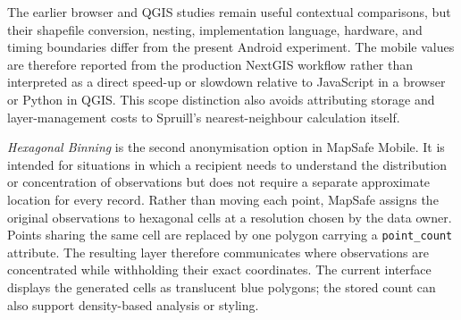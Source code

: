 \documentclass[a4paper,UKenglish,cleveref,autoref,thm-restate]{lipics-v2021}
\begin{document}
The earlier browser and QGIS studies remain useful contextual comparisons, but their shapefile conversion, nesting, implementation language, hardware, and timing boundaries differ from the present Android experiment. The mobile values are therefore reported from the production NextGIS workflow rather than interpreted as a direct speed-up or slowdown relative to JavaScript in a browser or Python in QGIS. This scope distinction also avoids attributing storage and layer-management costs to Spruill's nearest-neighbour calculation itself.



\emph{Hexagonal Binning} is the second anonymisation option in MapSafe Mobile. It is intended for situations in which a recipient needs to understand the distribution or concentration of observations but does not require a separate approximate location for every record. Rather than moving each point, MapSafe assigns the original observations to hexagonal cells at a resolution chosen by the data owner. Points sharing the same cell are replaced by one polygon carrying a \texttt{point\_count} attribute. The resulting layer therefore communicates where observations are concentrated while withholding their exact coordinates. The current interface displays the generated cells as translucent blue polygons; the stored count can also support density-based analysis or styling.
\end{document}
